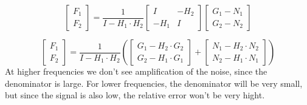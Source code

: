 \documentclass{article}
\begin{document}
\begin{enumerate}
    \[
        \begin{bmatrix}
            F_1 \\
            F_2
        \end{bmatrix}
        =
        \frac{1}{I - H_1 \cdot H_2}
        \begin{bmatrix}
            I & -H_2 \\
            -H_1 & I
        \end{bmatrix}
        \begin{bmatrix}
            G_1 - N_1\\
            G_2 - N_2
        \end{bmatrix}
    \]
    
    \[
        \begin{bmatrix}
            F_1 \\
            F_2
        \end{bmatrix}
        =
        \frac{1}{I - H_1 \cdot H_2}
	\left(
	\begin{bmatrix}
            G_1 - H_2 \cdot G_2 \\
            G_2 - H_1 \cdot G_1
        \end{bmatrix} 
	+ 
	\begin{bmatrix}
            N_1 - H_2 \cdot N_2 \\
            N_2 - H_1 \cdot N_1
        \end{bmatrix} 
	\right)
    \]
    At higher frequencies we don't see amplification of the noise, since the denominator is large. For lower frequencies, the denominator will be very small, but since the signal is also low, the relative error won't be very hight.
\end{enumerate}
\end{document}
